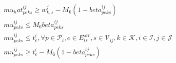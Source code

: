 \begin{align}
  & mu_hat_{p e k s}^{i j} \geq w_{k , s}^{j} - M_{6} \left(1 - \mathit{beta}_{p e k s}^{i j}\right) \tag{eq\_0085\_c} \\
  & {\mathit{mu}}_{p e k s}^{i j} \leq M_{6} \mathit{beta}_{p e k s}^{i j} \tag{eq\_0086\_a} \\
  & {\mathit{mu}}_{p e k s}^{i j} \leq t_{e}^{i} , \forall p \in \mathcal{P}_{i} , e \in E_{i s}^{\text{arr}} , s \in \mathcal{V}_{i j} , k \in \mathcal{K} , i \in \mathcal{I} , j \in \mathcal{J} \tag{eq\_0086\_b} \\
  & {\mathit{mu}}_{p e k s}^{i j} \geq t_{e}^{i} - M_{6} \left(1 - \mathit{beta}_{p e k s}^{i j}\right) \tag{eq\_0086\_c} \\
\end{align}
